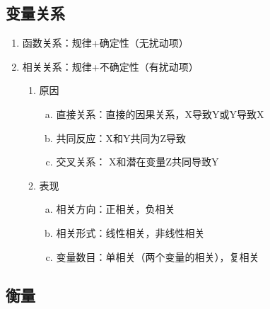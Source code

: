 \documentclass[12pt]{book}
\begin{document}

\subsection{变量关系}

\begin{enumerate}[1.]
    \item 函数关系：规律+确定性（无扰动项）  
    \item 相关关系：规律+不确定性（有扰动项）  
    \begin{enumerate}[(1)]
        \item 原因  
        \begin{enumerate}[a.]
            \item 直接关系：直接的因果关系，X导致Y或Y导致X  
            \item 共同反应：X和Y共同为Z导致  
            \item 交叉关系： X和潜在变量Z共同导致Y  
        \end{enumerate}
        \item 表现  
        \begin{enumerate}[a.]
            \item 相关方向：正相关，负相关   
            \item 相关形式：线性相关，非线性相关  
            \item 变量数目：单相关（两个变量的相关），复相关  
        \end{enumerate}
    \end{enumerate}
\end{enumerate}




\subsection{衡量}
\end{document}
